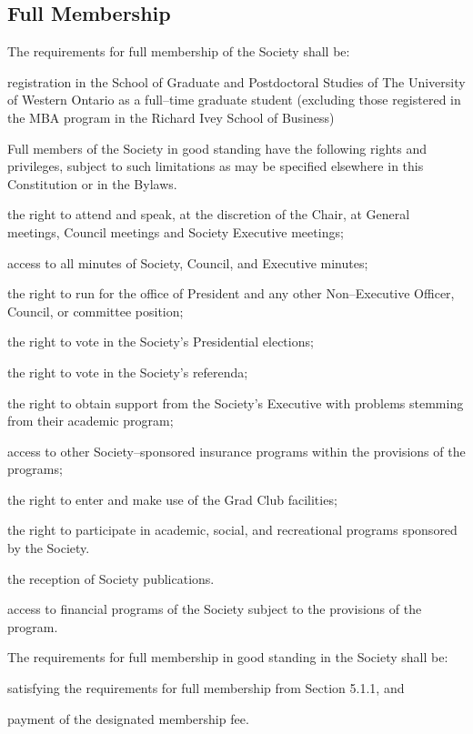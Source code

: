 \subsection{Full Membership}
	\begin{longenum}[label*=\thesubsection.\arabic*., align=left]
 \item The requirements for full membership of the Society shall be: 
     	\begin{longenum}[label*=\arabic*., align=left]
    	\item registration in the School of Graduate and Postdoctoral Studies of The University of Western Ontario as a full--time graduate student (excluding those registered in the MBA program in the Richard Ivey School of Business)
   	\end{longenum}
 \item  Full members of the Society in good standing have the following rights and privileges, subject to such limitations as may be specified elsewhere in this Constitution or in the Bylaws.
\begin{longenum}[label*=\arabic*., align=left]
  \item the right to attend and speak, at the discretion of the Chair, at General meetings, Council meetings and Society Executive meetings;
  \item access to all minutes of Society, Council, and Executive minutes;
  \item the right to run for the office of President and any other Non--Executive Officer, Council, or committee position;
  \item the right to vote in the Society's Presidential elections;
  \item the right to vote in the Society's referenda; 
  \item the right to obtain support from the Society's Executive with problems stemming from their academic program; 
  \item access to other Society--sponsored insurance programs within the provisions of the programs; 
  \item the right to enter and make use of the Grad Club facilities;
  \item the right to participate in academic, social, and recreational programs sponsored by the Society. 
  \item the reception of Society publications.
   \item access to financial programs of the Society subject to the provisions of the program.
	\end{longenum}
  \item The requirements for full membership in good standing in the Society shall be: 
  	\begin{longenum}[label*=\arabic*., align=left]
  	\item satisfying the requirements for full membership from Section 5.1.1, and 
    \item payment of the designated membership fee.  
  	\end{longenum}
 
\end{longenum}


